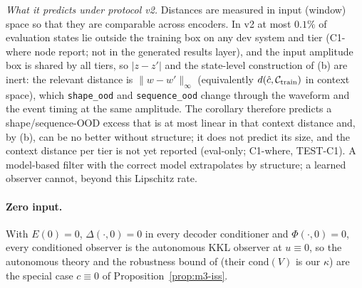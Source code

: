 \noindent\emph{What it predicts under protocol v2.} Distances are measured in input (window) space so that they are
comparable across encoders. In v2 at most $0.1\%$ of evaluation states lie outside the training box on any dev system
and tier (C1-where node report; not in the generated results layer), and the
input amplitude box is shared by all tiers, so $|z-z'|$ and the state-level construction of (b) are inert: the relevant
distance is $\|w-w'\|_\infty$ (equivalently $d(\hat c,\mathcal C_{\rm train})$ in context space), which \texttt{shape\_ood}
and \texttt{sequence\_ood} change through the waveform and the event timing at the same amplitude. The corollary therefore
predicts a shape/sequence-OOD excess that is at most linear in that context distance and, by (b), can be no better
without structure; it does not predict its size, and the context distance per tier is not yet reported (eval-only; C1-where,
TEST-C1). A model-based filter with the correct model extrapolates by structure; a learned observer cannot, beyond this
Lipschitz rate.

\paragraph{Zero input.} With $E(0)=0$, $\Delta(\cdot,0)=0$ in every decoder conditioner and $\Phi(\cdot,0)=0$, every
conditioned observer is the autonomous KKL observer at $u\equiv0$, so the autonomous theory
\citep[Theorems~2.2, 2.4, 2.7]{andrieu2006existence} and the robustness bound of \citet[Theorem~19]{niazi2025kkl}
(their $\mathrm{cond}(V)$ is our $\kappa$) are the special case $c\equiv0$ of Proposition~\ref{prop:m3-iss}.

